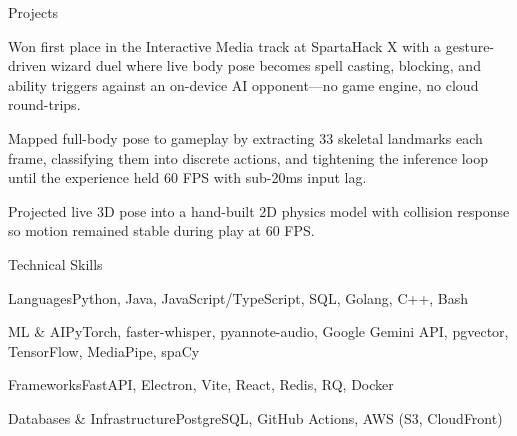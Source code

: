\documentclass[
	11pt
]{../../resume}
\begin{document}
\begin{rSection}{P}{rojects}
\begin{rSectionEntry}
			\item Won first place in the Interactive Media track at SpartaHack X with a gesture-driven wizard duel where live body pose becomes spell casting, blocking, and ability triggers against an on-device AI opponent---no game engine, no cloud round-trips.
			\item Mapped full-body pose to gameplay by extracting 33 skeletal landmarks each frame, classifying them into discrete actions, and tightening the inference loop until the experience held 60 FPS with sub-20ms input lag.
			\item Projected live 3D pose into a hand-built 2D physics model with collision response so motion remained stable during play at 60 FPS.
		\end{rSectionEntry}
	\end{rSection}

	\begin{rSection}{T}{echnical Skills}
		\begin{rSet}{Languages}{Python, Java, JavaScript/TypeScript, SQL, Golang, C++, Bash}
		\end{rSet}
		\begin{rSet}{ML \& AI}{PyTorch, faster-whisper, pyannote-audio, Google Gemini API, pgvector, TensorFlow, MediaPipe, spaCy}
		\end{rSet}
		\begin{rSet}{Frameworks}{FastAPI, Electron, Vite, React, Redis, RQ, Docker}
		\end{rSet}
		\begin{rSet}{Databases \& Infrastructure}{PostgreSQL, GitHub Actions, AWS (S3, CloudFront)}
		\end{rSet}
	\end{rSection}
\end{document}
